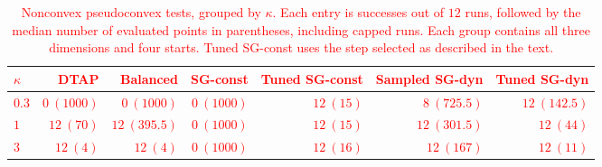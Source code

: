 \documentclass[]{interact}
\theoremstyle{plain}
\theoremstyle{definition}
\theoremstyle{remark}
\begin{document}
\begin{table}[t]
\centering\small
\setlength{\tabcolsep}{5pt}
\caption{\textcolor{red}{Nonconvex pseudoconvex tests, grouped by $\kappa$.
Each entry is successes out of $12$ runs, followed by the median number
of evaluated points in parentheses, including capped runs. Each group
contains all three dimensions and four starts. Tuned SG-const uses the step
selected as described in the text.}}
\label{tab:synthetic-scale}
\begin{tabular}{@{}lrrrrrr@{}}
\toprule
\leavevmode\textcolor{red}{$\kappa$} & \leavevmode\textcolor{red}{DTAP} & \leavevmode\textcolor{red}{Balanced} & \leavevmode\textcolor{red}{SG-const} & \leavevmode\textcolor{red}{Tuned SG-const} & \leavevmode\textcolor{red}{Sampled SG-dyn} & \leavevmode\textcolor{red}{Tuned SG-dyn}\\
\midrule
\leavevmode\textcolor{red}{$0.3$} & \leavevmode\textcolor{red}{$0\ (1000)$} & \leavevmode\textcolor{red}{$0\ (1000)$} & \leavevmode\textcolor{red}{$0\ (1000)$} & \leavevmode\textcolor{red}{$12\ (15)$} & \leavevmode\textcolor{red}{$8\ (725.5)$} & \leavevmode\textcolor{red}{$12\ (142.5)$}\\
\leavevmode\textcolor{red}{$1$}   & \leavevmode\textcolor{red}{$12\ (70)$} & \leavevmode\textcolor{red}{$12\ (395.5)$} & \leavevmode\textcolor{red}{$0\ (1000)$} & \leavevmode\textcolor{red}{$12\ (15)$} & \leavevmode\textcolor{red}{$12\ (301.5)$} & \leavevmode\textcolor{red}{$12\ (44)$}\\
\leavevmode\textcolor{red}{$3$}   & \leavevmode\textcolor{red}{$12\ (4)$} & \leavevmode\textcolor{red}{$12\ (4)$} & \leavevmode\textcolor{red}{$0\ (1000)$} & \leavevmode\textcolor{red}{$12\ (16)$} & \leavevmode\textcolor{red}{$12\ (167)$} & \leavevmode\textcolor{red}{$12\ (11)$}\\
\bottomrule
\end{tabular}
\end{table}
\end{document}
